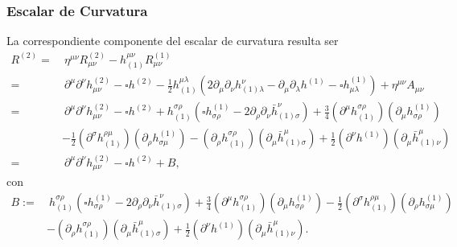 \subsubsection{Escalar de Curvatura}
La correspondiente componente del escalar de curvatura resulta ser
\begin{align}
R^{(2)} = &\ \eta^{\mu\nu}R^{(2)}_{\mu\nu}-h_{(1)}^{\mu\nu}R^{(1)}_{\mu\nu} \\
= &\ \partial^\mu\partial^\nu h^{(2)}_{\mu\nu} - \square h^{(2)}
-\frac{1}{2}h_{(1)}^{\mu\lambda}\left(2\partial_\mu\partial_\nu h^\nu_{(1)\lambda}
- \partial_\mu\partial_\lambda h^{(1)} -\square h^{(1)}_{\mu\lambda}\right)
+ \eta^{\mu\nu}A_{\mu\nu} \\
= &\ \partial^\mu\partial^\nu h^{(2)}_{\mu\nu} - \square h^{(2)}
+h_{(1)}^{\sigma\rho}\left(\square h^{(1)}_{\sigma\rho}
-2\partial_\rho\partial_\nu \bar{h}^\nu_{(1)\sigma}\right)
+\frac{3}{4}(\partial^\mu h_{(1)}^{\sigma\rho})(\partial_\mu h^{(1)}_{\sigma\rho}) \\
& -\frac{1}{2}(\partial^\sigma h_{(1)}^{\rho\mu})(\partial_\rho h^{(1)}_{\sigma\mu})
-(\partial_\rho h_{(1)}^{\sigma\rho})(\partial_\mu \bar{h}^\mu_{(1)\sigma})
+\frac{1}{2}(\partial^\nu h^{(1)})(\partial_\mu \bar{h}^\mu_{(1)\nu})\\
= &\ \partial^\mu\partial^\nu h^{(2)}_{\mu\nu} - \square h^{(2)}
+B,
\end{align}
con
\begin{align}
B := &\ h_{(1)}^{\sigma\rho}\left(\square h^{(1)}_{\sigma\rho}
-2\partial_\rho\partial_\nu \bar{h}^\nu_{(1)\sigma}\right)
+\frac{3}{4}(\partial^\mu h_{(1)}^{\sigma\rho})(\partial_\mu h^{(1)}_{\sigma\rho}) -\frac{1}{2}(\partial^\sigma h_{(1)}^{\rho\mu})(\partial_\rho h^{(1)}_{\sigma\mu}) \nonumber \\
& -(\partial_\rho h_{(1)}^{\sigma\rho})(\partial_\mu \bar{h}^\mu_{(1)\sigma})
+\frac{1}{2}(\partial^\nu h^{(1)})(\partial_\mu \bar{h}^\mu_{(1)\nu})
. \label{defB}
\end{align}

